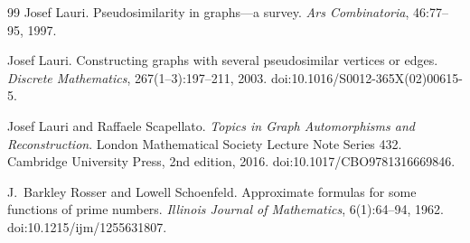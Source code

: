 \documentclass[11pt]{article}
\theoremstyle{definition}
\theoremstyle{remark}
\begin{document}
\begin{thebibliography}{99}
Josef Lauri.
\newblock Pseudosimilarity in graphs---a survey.
\newblock \emph{Ars Combinatoria}, 46:77--95, 1997.

Josef Lauri.
\newblock Constructing graphs with several pseudosimilar vertices or edges.
\newblock \emph{Discrete Mathematics}, 267(1--3):197--211, 2003.
\newblock doi:10.1016/S0012-365X(02)00615-5.

Josef Lauri and Raffaele Scapellato.
\newblock \emph{Topics in Graph Automorphisms and Reconstruction}.
\newblock London Mathematical Society Lecture Note Series 432. Cambridge University Press, 2nd edition, 2016.
\newblock doi:10.1017/CBO9781316669846.

J.~Barkley Rosser and Lowell Schoenfeld.
\newblock Approximate formulas for some functions of prime numbers.
\newblock \emph{Illinois Journal of Mathematics}, 6(1):64--94, 1962.
\newblock doi:10.1215/ijm/1255631807.

\end{thebibliography}
\end{document}
